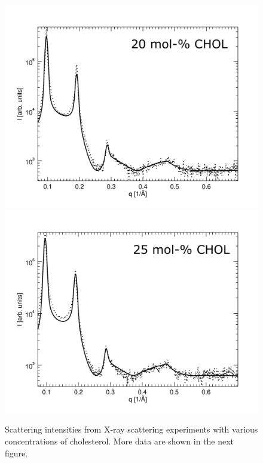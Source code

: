 \documentclass[journal=jpcbfk]{achemso}
\begin{document}
\begin{figure}[htb!]
    \includegraphics[width=0.49\linewidth]{FIGS/scatt20.pdf}
    \includegraphics[width=0.49\linewidth]{FIGS/scatt25.pdf}
    \caption{Scattering intensities from X-ray scattering experiments with various concentrations of cholesterol. More data are shown in the next figure.}
    \label{SIfig:scattering1}
\end{figure}
\end{document}
